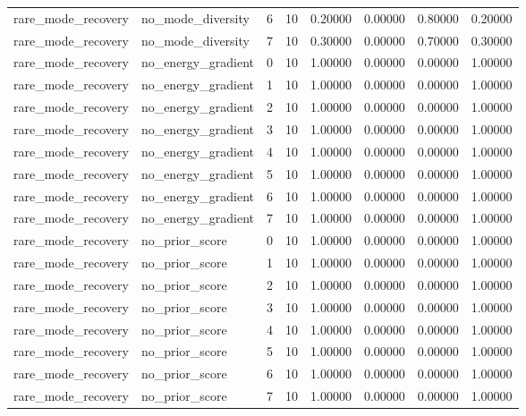\documentclass{article}
\begin{document}
\begin{table}[tbp]
{\begin{tabular}{llllllll}
rare\_mode\_recovery & no\_mode\_diversity & 6 & 10 & 0.20000 & 0.00000 & 0.80000 & 0.20000 \\
rare\_mode\_recovery & no\_mode\_diversity & 7 & 10 & 0.30000 & 0.00000 & 0.70000 & 0.30000 \\
rare\_mode\_recovery & no\_energy\_gradient & 0 & 10 & 1.00000 & 0.00000 & 0.00000 & 1.00000 \\
rare\_mode\_recovery & no\_energy\_gradient & 1 & 10 & 1.00000 & 0.00000 & 0.00000 & 1.00000 \\
rare\_mode\_recovery & no\_energy\_gradient & 2 & 10 & 1.00000 & 0.00000 & 0.00000 & 1.00000 \\
rare\_mode\_recovery & no\_energy\_gradient & 3 & 10 & 1.00000 & 0.00000 & 0.00000 & 1.00000 \\
rare\_mode\_recovery & no\_energy\_gradient & 4 & 10 & 1.00000 & 0.00000 & 0.00000 & 1.00000 \\
rare\_mode\_recovery & no\_energy\_gradient & 5 & 10 & 1.00000 & 0.00000 & 0.00000 & 1.00000 \\
rare\_mode\_recovery & no\_energy\_gradient & 6 & 10 & 1.00000 & 0.00000 & 0.00000 & 1.00000 \\
rare\_mode\_recovery & no\_energy\_gradient & 7 & 10 & 1.00000 & 0.00000 & 0.00000 & 1.00000 \\
rare\_mode\_recovery & no\_prior\_score & 0 & 10 & 1.00000 & 0.00000 & 0.00000 & 1.00000 \\
rare\_mode\_recovery & no\_prior\_score & 1 & 10 & 1.00000 & 0.00000 & 0.00000 & 1.00000 \\
rare\_mode\_recovery & no\_prior\_score & 2 & 10 & 1.00000 & 0.00000 & 0.00000 & 1.00000 \\
rare\_mode\_recovery & no\_prior\_score & 3 & 10 & 1.00000 & 0.00000 & 0.00000 & 1.00000 \\
rare\_mode\_recovery & no\_prior\_score & 4 & 10 & 1.00000 & 0.00000 & 0.00000 & 1.00000 \\
rare\_mode\_recovery & no\_prior\_score & 5 & 10 & 1.00000 & 0.00000 & 0.00000 & 1.00000 \\
rare\_mode\_recovery & no\_prior\_score & 6 & 10 & 1.00000 & 0.00000 & 0.00000 & 1.00000 \\
rare\_mode\_recovery & no\_prior\_score & 7 & 10 & 1.00000 & 0.00000 & 0.00000 & 1.00000 \\
\bottomrule
\end{tabular}
}
\end{table}

\clearpage
\end{document}
